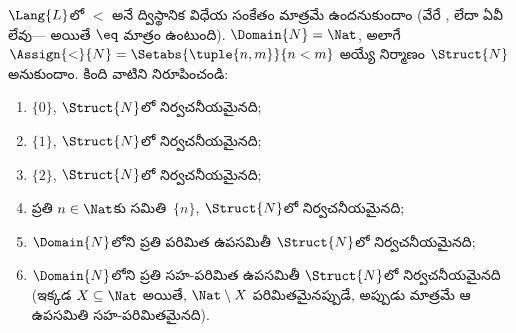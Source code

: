 \documentclass[../../../include/open-logic-section]{subfiles}
\begin{document}
\begin{prob}
$\Lang{L}$లో $<$ అనే ద్విస్థానిక విధేయ సంకేతం మాత్రమే ఉందనుకుందాం
(వేరే ,  లేదా  ఏవీ లేవు---
అయితే $\eq$ మాత్రం ఉంటుంది). $\Domain{N} = \Nat$, అలాగే
$\Assign{<}{N} = \Setabs{\tuple{n,m}}{n < m}$ అయ్యే నిర్మాణం
$\Struct{N}$ అనుకుందాం. కింది వాటిని నిరూపించండి:
\begin{enumerate}
\item $\{ 0 \}$, $\Struct{N}$లో నిర్వచనీయమైనది;
\item $\{ 1 \}$, $\Struct{N}$లో నిర్వచనీయమైనది;
\item $\{ 2 \}$, $\Struct{N}$లో నిర్వచనీయమైనది;
\item ప్రతి $n \in \Nat$కు సమితి~$\{ n \}$, $\Struct{N}$లో
  నిర్వచనీయమైనది;
\item $\Domain{N}$లోని ప్రతి పరిమిత ఉపసమితీ $\Struct{N}$లో
  నిర్వచనీయమైనది;
\item $\Domain{N}$లోని ప్రతి సహ-పరిమిత ఉపసమితీ $\Struct{N}$లో
  నిర్వచనీయమైనది (ఇక్కడ $X \subseteq \Nat$ అయితే, $\Nat \setminus X$
  పరిమితమైనప్పుడే, అప్పుడు మాత్రమే ఆ ఉపసమితి సహ-పరిమితమైనది).
\end{enumerate}
\end{prob}
\end{document}
